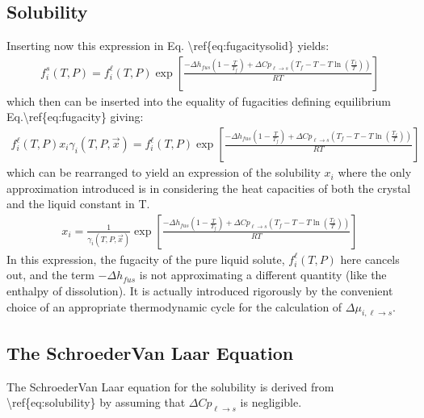 \documentclass[letterpaper,10pt,english]{jupyterBook}
\begin{document}
\subsection{Solubility}
\label{\detokenize{Solubility:solubility}}
\sphinxAtStartPar
Inserting now this expression in Eq. \textbackslash{}ref\{eq:fugacitysolid\} yields:
\begin{equation*}
\begin{split}
f_i^s(T,P)=f_i^\ell(T,P)\exp\left[\frac{{-\Delta{h_{fus}\left(1-\frac{T}{T_f}\right)}+\Delta{Cp}_{\ell\rightarrow{s}}\left(T_f-T-T\ln{\left(\frac{T_f}{T}\right)}\right)}}{RT}\right]
\end{split}
\end{equation*}
\sphinxAtStartPar
which then can be inserted into the equality of fugacities defining equilibrium Eq.\textbackslash{}ref\{eq:fugacity\} giving:
\begin{equation*}
\begin{split}
f_i^\ell(T,P)x_i\gamma_i(T,P,\vec{x})=f_i^\ell(T,P)\exp\left[\frac{{-\Delta{h_{fus}\left(1-\frac{T}{T_f}\right)}+\Delta{Cp}_{\ell\rightarrow{s}}\left(T_f-T-T\ln{\left(\frac{T_f}{T}\right)}\right)}}{RT}\right]
\end{split}
\end{equation*}
\sphinxAtStartPar
which can be rearranged to yield an expression of the solubility \(x_i\) where the only approximation introduced is in considering the heat capacities of both the crystal and the liquid constant in T.
\begin{equation*}
\begin{split}
x_i=\frac{1}{\gamma_i(T,P,\vec{x})}\exp\left[\frac{{-\Delta{h_{fus}\left(1-\frac{T}{T_f}\right)}+\Delta{Cp}_{\ell\rightarrow{s}}\left(T_f-T-T\ln{\left(\frac{T_f}{T}\right)}\right)}}{RT}\right]
\end{split}
\end{equation*}
\sphinxAtStartPar
In this expression, the fugacity of the pure liquid solute, \(f_i^\ell(T,P)\) here cancels out, and the term \(-\Delta{h_{fus}}\) is not approximating a different quantity (like the enthalpy of dissolution). It is actually introduced rigorously by the convenient choice of an appropriate thermodynamic cycle for the calculation of \(\Delta\mu_{i,\ell\rightarrow{s}}\).


\subsection{The Schroeder\sphinxhyphen{}Van Laar Equation}
\label{\detokenize{Solubility:the-schroeder-van-laar-equation}}
\sphinxAtStartPar
The Schroeder\sphinxhyphen{}Van Laar equation for the solubility is derived from \textbackslash{}ref\{eq:solubility\} by assuming that \(\Delta{Cp}_{\ell\rightarrow{s}}\) is negligible.
\end{document}
